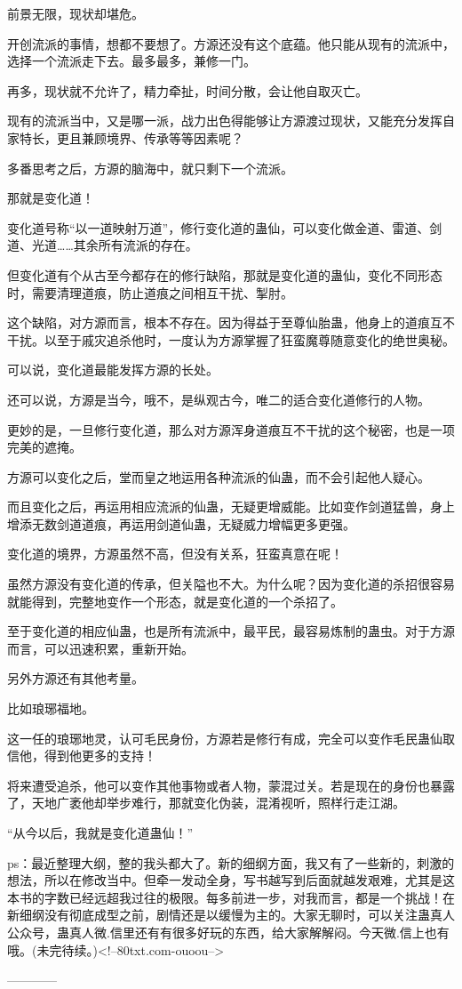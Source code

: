 \begin{this_body}
前景无限，现状却堪危。

开创流派的事情，想都不要想了。方源还没有这个底蕴。他只能从现有的流派中，选择一个流派走下去。最多最多，兼修一门。

再多，现状就不允许了，精力牵扯，时间分散，会让他自取灭亡。

现有的流派当中，又是哪一派，战力出色得能够让方源渡过现状，又能充分发挥自家特长，更且兼顾境界、传承等等因素呢？

多番思考之后，方源的脑海中，就只剩下一个流派。

那就是变化道！

变化道号称“以一道映射万道”，修行变化道的蛊仙，可以变化做金道、雷道、剑道、光道……其余所有流派的存在。

但变化道有个从古至今都存在的修行缺陷，那就是变化道的蛊仙，变化不同形态时，需要清理道痕，防止道痕之间相互干扰、掣肘。

这个缺陷，对方源而言，根本不存在。因为得益于至尊仙胎蛊，他身上的道痕互不干扰。以至于戚灾追杀他时，一度认为方源掌握了狂蛮魔尊随意变化的绝世奥秘。

可以说，变化道最能发挥方源的长处。

还可以说，方源是当今，哦不，是纵观古今，唯二的适合变化道修行的人物。

更妙的是，一旦修行变化道，那么对方源浑身道痕互不干扰的这个秘密，也是一项完美的遮掩。

方源可以变化之后，堂而皇之地运用各种流派的仙蛊，而不会引起他人疑心。

而且变化之后，再运用相应流派的仙蛊，无疑更增威能。比如变作剑道猛兽，身上增添无数剑道道痕，再运用剑道仙蛊，无疑威力增幅更多更强。

变化道的境界，方源虽然不高，但没有关系，狂蛮真意在呢！

虽然方源没有变化道的传承，但关隘也不大。为什么呢？因为变化道的杀招很容易就能得到，完整地变作一个形态，就是变化道的一个杀招了。

至于变化道的相应仙蛊，也是所有流派中，最平民，最容易炼制的蛊虫。对于方源而言，可以迅速积累，重新开始。

另外方源还有其他考量。

比如琅琊福地。

这一任的琅琊地灵，认可毛民身份，方源若是修行有成，完全可以变作毛民蛊仙取信他，得到他更多的支持！

将来遭受追杀，他可以变作其他事物或者人物，蒙混过关。若是现在的身份也暴露了，天地广袤他却举步难行，那就变化伪装，混淆视听，照样行走江湖。

“从今以后，我就是变化道蛊仙！”

ps：最近整理大纲，整的我头都大了。新的细纲方面，我又有了一些新的，刺激的想法，所以在修改当中。但牵一发动全身，写书越写到后面就越发艰难，尤其是这本书的字数已经远超我过往的极限。每多前进一步，对我而言，都是一个挑战！在新细纲没有彻底成型之前，剧情还是以缓慢为主的。大家无聊时，可以关注蛊真人公众号，蛊真人微.信里还有有很多好玩的东西，给大家解解闷。今天微.信上也有哦。(未完待续。)<!--80txt.com-ouoou-->

------------

\end{this_body}

